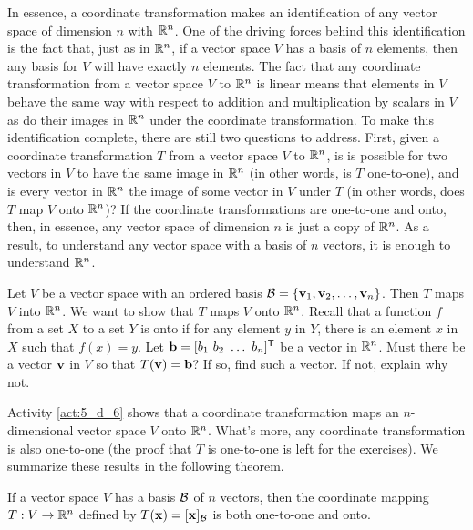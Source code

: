 In essence, a coordinate transformation makes an identification of any vector space of dimension $n$ with $\mathbb{R}^n$. One of the driving forces behind this identification is the fact that, just as in $\mathbb{R}^n$, if a vector space $V$ has a basis of $n$ elements, then any basis for $V$ will have exactly $n$ elements. The fact that any coordinate transformation from a vector space $V$ to $\mathbb{R}^n$ is linear means that elements in $V$ behave the same way with respect to addition and multiplication by scalars in $V$ as do their images in $\mathbb{R}^n$ under the coordinate transformation. To make this identification complete, there are still two questions to address. First, given a coordinate transformation $T$ from a vector space $V$ to $\mathbb{R}^n$, is is possible for two vectors in $V$ to have the same image in $\mathbb{R}^n$ (in other words, is $T$ one-to-one), and is every vector in $\mathbb{R}^n$ the image of some vector in $V$ under $T$ (in other words, does $T$ map $V$ onto $\mathbb{R}^n$)? If the coordinate transformations are one-to-one and onto, then, in essence, any vector space of dimension $n$ is just a copy of $\mathbb{R}^n$. As a result, to understand any vector space with a basis of $n$ vectors, it is enough to understand $\mathbb{R}^n$.


\begin{activity} \label{act:5_d_6} Let $V$ be a vector space with an ordered basis $\mathcal{B} = \{\mathbf{v}_1, \mathbf{v}_2, \ldots, \mathbf{v}_n\}$. Then $T$ maps $V$ into $\mathbb{R}^n$. We want to show that  $T$ maps $V$ onto $\mathbb{R}^n$. Recall that a function $f$ from a set $X$ to a set $Y$ is onto if for any element $y$ in $Y$, there is an element $x$ in $X$ such that $f(x) = y$. Let $\vb = [b_1 \ b_2 \ \ldots \ b_n]^{\tr}$ be a vector in $\mathbb{R}^n$. Must there be a vector $\mathbf{v}$ in $V$ so that $T(\mathbf{v}) = \mathbf{b}$? If so, find such a vector. If not, explain why not.
	
\end{activity}


Activity \ref{act:5_d_6} shows that a coordinate transformation maps an $n$-dimensional vector space $V$ onto $\mathbb{R}^n$. What's more, any coordinate transformation is also one-to-one (the proof that $T$ is one-to-one is left for the exercises). We summarize these results in the following theorem.



\begin{theorem} \label{thm:5_d_6} If a vector space $V$ has a basis $\mathcal{B}$ of $n$ vectors, then the coordinate mapping $T : V \to \mathbb{R}^n$ defined by $T(\mathbf{x}) = [\mathbf{x}]_{\mathcal{B}}$ is both one-to-one and onto.  
\end{theorem}

